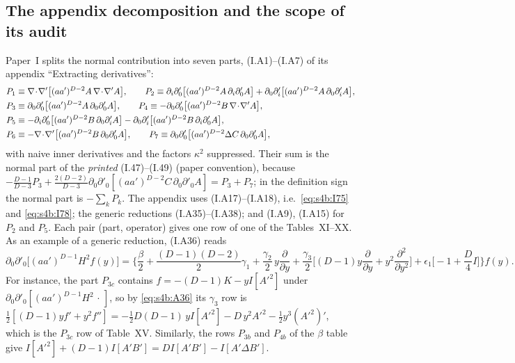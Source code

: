\documentclass[aps,prd,onecolumn,10pt,nofootinbib,floatfix]{revtex4-2}
\newcommand{\PI}{Paper~I}
\newcommand{\eqI}[1]{(I.#1)}
\begin{document}
\subsection{The appendix decomposition and the scope of its audit}
\label{sec:s4b:appendix}

\PI{} splits the normal contribution into seven parts, \eqI{A1}--\eqI{A7} of its appendix ``Extracting derivatives'':
\begin{equation}
\begin{aligned}
P_1&\equiv\sivbdd\big[(aa')^{D-2}A\,\sivbdd A\big],\qquad
P_2\equiv\partial_i\partial'_0\big[(aa')^{D-2}A\,\partial_i\partial'_0A\big]+\partial_0\partial'_i\big[(aa')^{D-2}A\,\partial_0\partial'_iA\big],\\
P_3&\equiv\partial_0\partial'_0\big[(aa')^{D-2}A\,\partial_0\partial'_0A\big],\qquad
P_4\equiv-\partial_0\partial'_0\big[(aa')^{D-2}B\,\sivbdd A\big],\\
P_5&\equiv-\partial_i\partial'_0\big[(aa')^{D-2}B\,\partial_0\partial'_iA\big]-\partial_0\partial'_i\big[(aa')^{D-2}B\,\partial_i\partial'_0A\big],\\
P_6&\equiv-\sivbdd\big[(aa')^{D-2}B\,\partial_0\partial'_0A\big],\qquad
P_7\equiv\partial_0\partial'_0\big[(aa')^{D-2}\Delta C\,\partial_0\partial'_0A\big],
\end{aligned}
\label{eq:s4b:Pk}
\end{equation}
with naive inner derivatives and the factors $\kappa^2$ suppressed. Their sum is the normal part of the
\emph{printed} \eqI{47}--\eqI{49} (paper convention), because
$-\frac{D-1}{D-3}P_3+\frac{2(D-2)}{D-3}\partial_0\partial'_0[(aa')^{D-2}C\,\partial_0\partial'_0A]=P_3+P_7$; in the
definition sign the normal part is $-\sum_kP_k$. The appendix uses \eqI{A17}--\eqI{A18}, i.e.\ \eqref{eq:s4b:I75} and
\eqref{eq:s4b:I78}; the generic reductions \eqI{A35}--\eqI{A38}; and \eqI{A9}, \eqI{A15} for $P_2$ and $P_5$. Each pair (part,
operator) gives one row of one of the Tables~XI--XX. As an example of a generic reduction, \eqI{A36} reads
\begin{equation}
\partial_0\partial'_0\big[(aa')^{D-1}H^2f(y)\big]=\Big\{\frac\beta2+\frac{(D-1)(D-2)}{2}\gamma_1+\frac{\gamma_2}{2}\,y\frac{\partial}{\partial y}
+\frac{\gamma_3}{2}\Big[(D-1)y\frac{\partial}{\partial y}+y^2\frac{\partial^2}{\partial y^2}\Big]
+\epsilon_1\Big[-1+\frac D4I\Big]\Big\}f(y).
\label{eq:s4b:A36}
\end{equation}
For instance, the part $P_{3c}$ contains $f=-(D-1)K-yI[A'^2]$ under
$\partial_0\partial'_0[(aa')^{D-1}H^2\,\cdot\,]$, so by \eqref{eq:s4b:A36} its $\gamma_3$ row is
$\frac12[(D-1)yf'+y^2f'']=-\frac12D(D-1)\,yI[A'^2]-D\,y^2A'^2-\frac12y^3(A'^2)'$, which is the $P_{3c}$ row of
Table~XV\@. Similarly, the rows $P_{3b}$ and $P_{4b}$ of the $\beta$ table give
$I[A'^2]+(D-1)I[A'B']=DI[A'B']-I[A'\Delta B']$.
\end{document}
